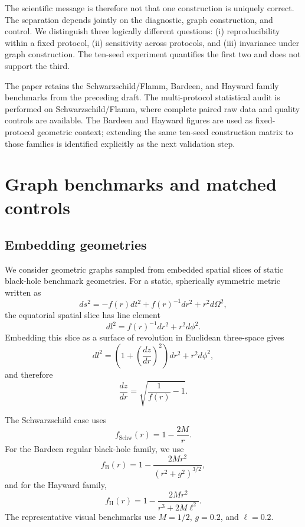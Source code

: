 \documentclass[11pt]{article}
\begin{document}
The scientific message is therefore not that one construction is uniquely
correct. The separation depends jointly on the diagnostic, graph construction,
and control. We distinguish three logically different questions:
(i) reproducibility within a fixed protocol, (ii) sensitivity across protocols,
and (iii) invariance under graph construction. The ten-seed experiment quantifies
the first two and does not support the third.

The paper retains the Schwarzschild/Flamm, Bardeen, and Hayward family
benchmarks from the preceding draft. The multi-protocol statistical audit is
performed on Schwarzschild/Flamm, where complete paired raw data and quality
controls are available. The Bardeen and Hayward figures are used as
fixed-protocol geometric context; extending the same ten-seed construction
matrix to those families is identified explicitly as the next validation step.

\section{Graph benchmarks and matched controls}

\subsection{Embedding geometries}

We consider geometric graphs sampled from embedded spatial slices of static
black-hole benchmark geometries. For a static, spherically symmetric metric
written as
\begin{equation}
    ds^2 = -f(r)dt^2 + f(r)^{-1}dr^2 + r^2d\Omega^2,
\end{equation}
the equatorial spatial slice has line element
\begin{equation}
    dl^2 = f(r)^{-1}dr^2 + r^2d\phi^2 .
\end{equation}
Embedding this slice as a surface of revolution in Euclidean three-space gives
\begin{equation}
    dl^2 =
    \left(1+\left(\frac{dz}{dr}\right)^2\right)dr^2+r^2d\phi^2,
\end{equation}
and therefore
\begin{equation}
    \frac{dz}{dr} =
    \sqrt{\frac{1}{f(r)}-1}.
\end{equation}

The Schwarzschild case uses
\begin{equation}
    f_{\mathrm{Schw}}(r) = 1-\frac{2M}{r}.
\end{equation}
For the Bardeen regular black-hole family, we use
\begin{equation}
    f_{\mathrm{B}}(r)
    =
    1-\frac{2Mr^2}{(r^2+g^2)^{3/2}},
\end{equation}
and for the Hayward family,
\begin{equation}
    f_{\mathrm{H}}(r)
    =
    1-\frac{2Mr^2}{r^3+2M\ell^2}.
\end{equation}
The representative visual benchmarks use $M=1/2$, $g=0.2$, and $\ell=0.2$.
\end{document}
